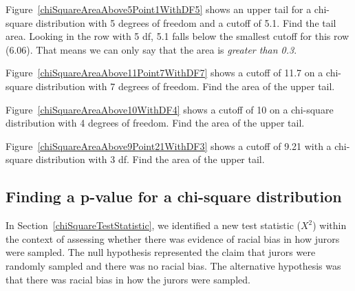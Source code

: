 \begin{examplewrap}
\begin{nexample}{Figure~\ref{chiSquareAreaAbove5Point1WithDF5} shows an upper tail for a chi-square distribution with 5 degrees of freedom and a cutoff of 5.1. Find the tail area.}
Looking in the row with 5 df, 5.1 falls below the smallest cutoff for this row (6.06). That means we can only say that the area is \emph{greater than 0.3}.
\end{nexample}
\end{examplewrap}

\begin{exercisewrap}
\begin{nexercise}
Figure~\ref{chiSquareAreaAbove11Point7WithDF7} shows a cutoff of 11.7 on a chi-square distribution with 7 degrees of freedom. Find the area of the upper tail.\footnotemark
\end{nexercise}
\end{exercisewrap}

\begin{exercisewrap}
\begin{nexercise}
Figure~\ref{chiSquareAreaAbove10WithDF4} shows a cutoff of 10 on a chi-square distribution with 4 degrees of freedom. Find the area of the upper tail.\footnotemark
\end{nexercise}
\end{exercisewrap}

\begin{exercisewrap}
\begin{nexercise}
Figure~\ref{chiSquareAreaAbove9Point21WithDF3} shows a cutoff of 9.21 with a chi-square distribution with 3 df. Find the area of the upper tail.\footnotemark
\end{nexercise}
\end{exercisewrap}


\subsection{Finding a p-value for a chi-square distribution}
\label{pValueForAChiSquareTest}

In Section~\ref{chiSquareTestStatistic}, we identified a new test statistic ($X^2$) within the context of assessing whether there was evidence of racial bias in how jurors were sampled. The null hypothesis represented the claim that jurors were randomly sampled and there was no racial bias. The alternative hypothesis was that there was racial bias in how the jurors were sampled.


